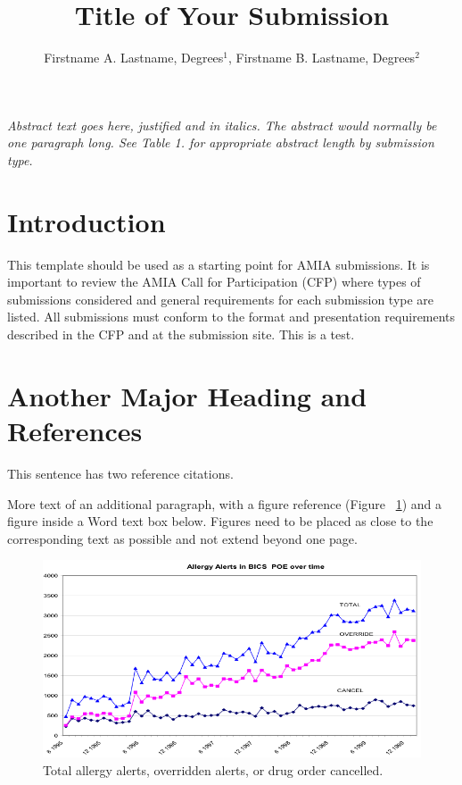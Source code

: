 \documentclass{amia}
\begin{document}
\title{Title of Your Submission}

\author{Firstname A. Lastname, Degrees$^{1}$, Firstname B. Lastname, Degrees$^{2}$}


\maketitle


\textit{Abstract text goes here, justified and in italics.  The abstract would normally be one paragraph long.  See Table 1. for appropriate abstract length by submission type.}

\section*{Introduction}
This template should be used as a starting point for AMIA submissions.  
It is important to review the AMIA Call for Participation (CFP) where types of submissions considered and general requirements for each submission type are listed. All submissions must conform to the format and presentation requirements described in the CFP and at the submission site. This is a test.


\section*{Another Major Heading and References}
This sentence has two reference citations\cite{ref1,ref2}.

More text of an additional paragraph, with a figure reference (Figure ~\ref{fig1}) and a figure inside a Word text box below.  Figures need to be placed as close to the corresponding text as possible and not extend beyond one page.\\
\begin{figure}[h!]
	\centering
	\includegraphics[scale=1]{pics/figure1.png}
	\caption{Total allergy alerts, overridden alerts, or drug order cancelled.}
	\label{fig1}
\end{figure}
\end{document}
